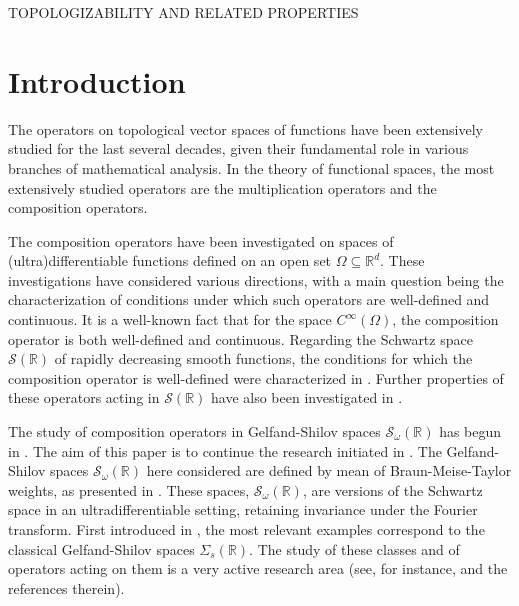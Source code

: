 \documentclass[12pt,reqno]{amsart} %
\numberwithin{equation}{section}
\begin{document}
\maketitle

%
{\MakeUppercase{Topologizability and related properties }}

\section{Introduction}

The operators on topological vector spaces of  functions have been extensively studied for the last several decades, given their fundamental role in various branches of mathematical analysis.  In the theory of functional spaces, the most extensively studied operators are the multiplication operators and the composition operators.


The composition operators have been investigated on spaces of (ultra)differentia\-ble functions defined on an open set $\Omega \subseteq \mathbb{R}^d$. These investigations have considered various directions, with a main question being the characterization of conditions under which such operators are well-defined and continuous. It is a well-known fact that for the space $C^\infty(\Omega)$, the composition operator is both well-defined and continuous. Regarding the Schwartz space $\mathcal{S}(\mathbb{R})$ of rapidly decreasing smooth functions, the conditions for which the composition operator is well-defined were characterized in \cite{galbis}. Further properties of these operators acting in $\mathcal{S}(\mathbb{R})$ have also been investigated in \cite{akj,fgj,advances}. 


The study of composition operators in Gelfand-Shilov spaces ${\mathcal S}_\omega({\mathbb R})$ has begun  in \cite{jmaa, RACSAM}.
The aim of this paper is to continue the research initiated in \cite{jmaa, RACSAM}.
The Gelfand-Shilov spaces ${\mathcal S}_\omega({\mathbb R})$ here considered are defined by mean of
Braun-Meise-Taylor weights, as presented in \cite{bmt}. These spaces, ${\mathcal S}_\omega({\mathbb R})$, are versions of the Schwartz space in an ultradifferentiable setting, retaining invariance under the Fourier transform. First introduced in \cite{bjorck}, the most relevant examples correspond to the classical Gelfand-Shilov spaces $\Sigma_s({\mathbb R}).$
The study of these classes and of operators acting on them is a very   active research area (see, for instance, \cite{am,ajm,asensio_jornet,capiello,cprt,debrouwere} and the references therein).
\end{document}

